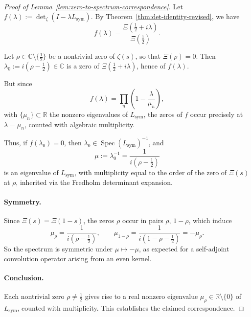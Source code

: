 \begin{proof}[Proof of Lemma~\ref{lem:zero-to-spectrum-correspondence}]
Let \( f(\lambda) := \det\nolimits_\zeta(I - \lambda L_{\mathrm{sym}}) \). By Theorem~\ref{thm:det-identity-revised}, we have
\[
f(\lambda) = \frac{\Xi\left( \tfrac{1}{2} + i\lambda \right)}{\Xi\left( \tfrac{1}{2} \right)}.
\]

Let \( \rho \in \mathbb{C} \setminus \{\tfrac{1}{2}\} \) be a nontrivial zero of \( \zeta(s) \), so that \( \Xi(\rho) = 0 \). Then \( \lambda_0 := i(\rho - \tfrac{1}{2}) \in \mathbb{C} \) is a zero of \( \Xi\left( \tfrac{1}{2} + i\lambda \right) \), hence of \( f(\lambda) \).

But since
\[
f(\lambda) = \prod_n \left( 1 - \frac{\lambda}{\mu_n} \right),
\]
with \( \{ \mu_n \} \subset \mathbb{R} \) the nonzero eigenvalues of \( L_{\mathrm{sym}} \), the zeros of \( f \) occur precisely at \( \lambda = \mu_n \), counted with algebraic multiplicity.

Thus, if \( f(\lambda_0) = 0 \), then \( \lambda_0 \in \operatorname{Spec}(L_{\mathrm{sym}})^{-1} \), and
\[
\mu := \lambda_0^{-1} = \frac{1}{i(\rho - \tfrac{1}{2})}
\]
is an eigenvalue of \( L_{\mathrm{sym}} \), with multiplicity equal to the order of the zero of \( \Xi(s) \) at \( \rho \), inherited via the Fredholm determinant expansion.

\paragraph{Symmetry.}
Since \( \Xi(s) = \Xi(1 - s) \), the zeros \( \rho \) occur in pairs \( \rho \), \( 1 - \rho \), which induce
\[
\mu_\rho = \frac{1}{i(\rho - \tfrac{1}{2})}, \qquad \mu_{1 - \rho} = \frac{1}{i(1 - \rho - \tfrac{1}{2})} = -\mu_\rho.
\]
So the spectrum is symmetric under \( \mu \mapsto -\mu \), as expected for a self-adjoint convolution operator arising from an even kernel.

\paragraph{Conclusion.}
Each nontrivial zero \( \rho \ne \tfrac{1}{2} \) gives rise to a real nonzero eigenvalue \( \mu_\rho \in \mathbb{R} \setminus \{0\} \) of \( L_{\mathrm{sym}} \), counted with multiplicity. This establishes the claimed correspondence.
\end{proof}
% 